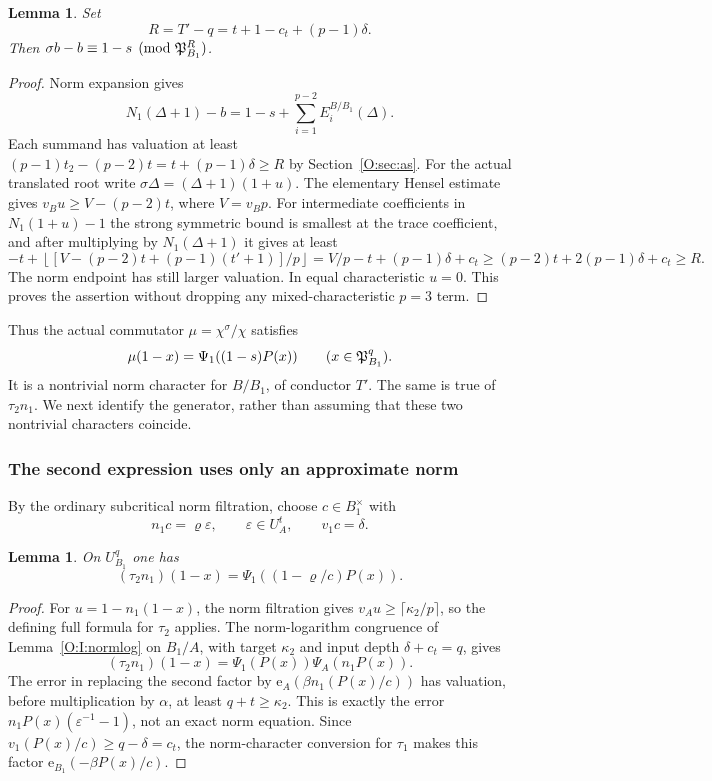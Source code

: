 \documentclass[11pt]{amsart}
\newtheorem{lemma}[theorem]{Lemma}
\theoremstyle{definition}
\theoremstyle{remark}
\newcommand{\floor}[1]{\left\lfloor #1\right\rfloor}
\begin{document}
\begin{lemma}\label{O:R:shift}
Set
\[
 R=T'-q=t+1-c_t+(p-1)\delta.
\]
Then $\sigma b-b\equiv1-s\pmod{\mathfrak P_{B_1}^R}$.
\end{lemma}
\begin{proof}
Norm expansion gives
\[
 N_1(\Delta+1)-b=1-s+\sum_{i=1}^{p-2}E_i^{B/B_1}(\Delta).
\]
Each summand has valuation at least
$(p-1)t_2-(p-2)t=t+(p-1)\delta\ge R$ by Section~\ref{O:sec:as}.
For the actual translated root write
$\sigma\Delta=(\Delta+1)(1+u)$.
The elementary Hensel estimate gives
$v_Bu\ge V-(p-2)t$, where $V=v_Bp$.
For intermediate coefficients in $N_1(1+u)-1$ the strong symmetric bound
is smallest at the trace coefficient, and after multiplying by
$N_1(\Delta+1)$ it gives at least
\[
 -t+\floor{[V-(p-2)t+(p-1)(t'+1)]/p}
 =V/p-t+(p-1)\delta+c_t
 \ge(p-2)t+2(p-1)\delta+c_t\ge R.
\]
The norm endpoint has still larger valuation. In equal characteristic
$u=0$. This proves the assertion without dropping any mixed-characteristic
$p=3$ term.
\end{proof}

Thus the actual commutator $\mu=\chi^\sigma/\chi$ satisfies
\begin{equation}\label{O:R:S}
 \mu(1-x)=\Psi_1((1-s)P(x))\qquad(x\in\mathfrak P_{B_1}^{q}).
\end{equation}
It is a nontrivial norm character for $B/B_1$, of conductor $T'$.
The same is true of $\tau_2n_1$. We next identify the generator, rather than
assuming that these two nontrivial characters coincide.

\subsubsection*{The second expression uses only an approximate norm}
By the ordinary subcritical norm filtration, choose $c\in B_1^\times$ with
\begin{equation}\label{O:R:approx}
 n_1c=\varrho\varepsilon,\qquad\varepsilon\in U_A^t,\qquad v_1c=\delta.
\end{equation}
\begin{lemma}\label{O:R:T}
On $U_{B_1}^{q}$ one has
\[
 (\tau_2n_1)(1-x)=\Psi_1((1-\varrho/c)P(x)).
\]
\end{lemma}
\begin{proof}
For $u=1-n_1(1-x)$, the norm filtration gives
$v_Au\ge\lceil \kappa_2/p\rceil$, so the defining full formula for $\tau_2$
applies. The norm-logarithm congruence of Lemma~\ref{O:I:normlog} on $B_1/A$, with target
$\kappa_2$ and input depth $\delta+c_t=q$, gives
\[
 (\tau_2n_1)(1-x)=\Psi_1(P(x))\Psi_A(n_1P(x)).
\]
The error in replacing the second factor by
$\mathrm e_A(\beta n_1(P(x)/c))$ has valuation, before multiplication by
$\alpha$, at least $q+t\ge \kappa_2$. This is exactly the error
$n_1P(x)(\varepsilon^{-1}-1)$, not an exact norm equation.
Since $v_1(P(x)/c)\ge q-\delta=c_t$, the norm-character conversion for
$\tau_1$ makes this factor $\mathrm e_{B_1}(-\beta P(x)/c)$.
\end{proof}
\end{document}
